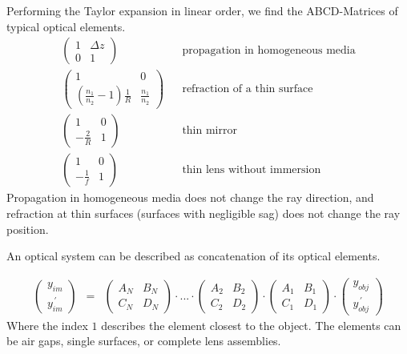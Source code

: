 \documentclass[12pt,a4paper,twoside,openright,BCOR10mm,headsepline,titlepage,abstracton,chapterprefix,final]{scrreprt}
\begin{document}
Performing the Taylor expansion in linear order, we find the ABCD-Matrices of typical optical elements. 
\begin{eqnarray}
 \begin{pmatrix}
  1 & \Delta z \\ 0 & 1
 \end{pmatrix}
 && \textrm{propagation in homogeneous media}
 \\
 \begin{pmatrix}
  1 & 0 \\ \left( \frac{n_1}{n_2} - 1 \right) \frac{1}{R} & \frac{n_1}{n_2}
 \end{pmatrix}
 && \textrm{refraction of a thin surface}
 \\
 \begin{pmatrix}
  1 & 0 \\ -\frac{2}{R} & 1
 \end{pmatrix}
 && \textrm{thin mirror}
 \\
 \begin{pmatrix}
  1 & 0 \\ -\frac{1}{f} & 1
 \end{pmatrix}
 && \textrm{thin lens without immersion}
\end{eqnarray}
Propagation in homogeneous media does not change the ray direction, and refraction at thin surfaces (surfaces with negligible sag) does not change the ray position.

An optical system can be described as concatenation of its optical elements.

\begin{eqnarray}
 \begin{pmatrix}
  y_{im} \\ y_{im}^{\,\prime}
 \end{pmatrix}
 &=&
 \begin{pmatrix}
  A_N & B_N \\ C_N & D_N
 \end{pmatrix}
 \cdot
 ...
 \cdot
 \begin{pmatrix}
  A_2 & B_2 \\ C_2 & D_2
 \end{pmatrix}
 \cdot
 \begin{pmatrix}
  A_1 & B_1 \\ C_1 & D_1
 \end{pmatrix}
 \cdot
 \begin{pmatrix}
  y_{obj} \\ y_{obj}^{\,\prime}
 \end{pmatrix}
\end{eqnarray}
Where the index $1$ describes the element closest to the object.
The elements can be air gaps, single surfaces, or complete lens assemblies.
\end{document}
